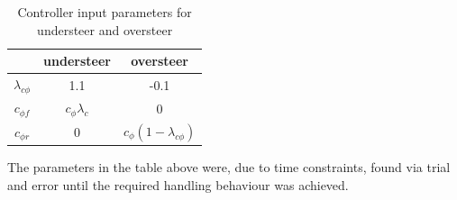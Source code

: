 \begin{table}[H]
    \centering
    \begin{tabular}{c|c|c}
                    & understeer & oversteer\\\hline
         $\lambda_{c\phi}$ & 1.1  & -0.1\\
          $c_{\phi f}$ & $c_\phi\lambda_c$ & 0\\
          $c_{\phi r}$ & 0 &$c_\phi(1-\lambda_{c\phi})$
    \end{tabular}
    \caption{Controller input parameters for understeer and oversteer}
    \label{tab:my_label}
\end{table}

The parameters in the table above were, due to time constraints, found via trial and error until the required handling behaviour was achieved. 

